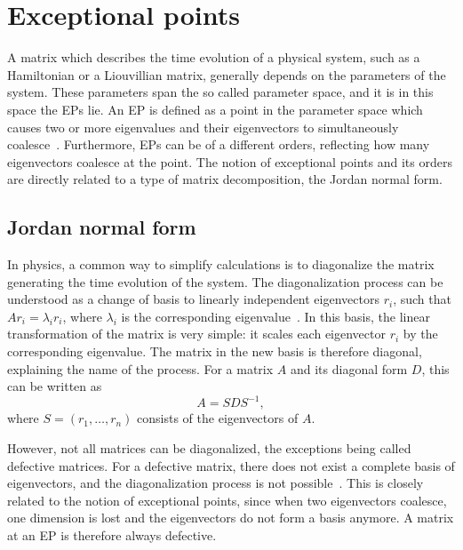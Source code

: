 \documentclass[../main.tex]{subfiles}
\begin{document}

\section{Exceptional points}\label{sec:ep}
A matrix which describes the time evolution of a physical system, such as a Hamiltonian or a Liouvillian matrix, generally depends on the parameters of the system. These parameters span the so called parameter space, and it is in this space the EPs lie. An EP is defined as a point in the parameter space which causes two or more eigenvalues and their eigenvectors to simultaneously coalesce~\cite{nonHermrev}. Furthermore, EPs can be of a different orders, reflecting how many eigenvectors coalesce at the point. The notion of exceptional points and its orders are directly related to a type of matrix decomposition, the Jordan normal form.

\subsection{Jordan normal form}\label{sec:jordan}

In physics, a common way to simplify calculations is to diagonalize the matrix generating the time evolution of the system. The diagonalization process can be understood as a change of basis to linearly independent eigenvectors $r_i$, such that $Ar_i=\lambda_ir_i$, where $\lambda_i$ is the corresponding eigenvalue~\cite{uffe}. In this basis, the linear transformation of the matrix is very simple: it scales each eigenvector $r_i$ by the corresponding eigenvalue. The matrix in the new basis is therefore diagonal, explaining the name of the process. For a matrix $A$ and its diagonal form $D$, this can be written as 
\begin{equation}
    A = SDS^{-1},
\end{equation}
where $S = (r_1, \dots ,r_n)$ consists of the eigenvectors of $A$.

However, not all matrices can be diagonalized, the exceptions being called defective matrices. For a defective matrix, there does not exist a complete basis of eigenvectors, and the diagonalization process is not possible~\cite{uffe}. This is closely related to the notion of exceptional points, since when two eigenvectors coalesce, one dimension is lost and the eigenvectors do not form a basis anymore. A matrix at an EP is therefore always defective.
\end{document}
